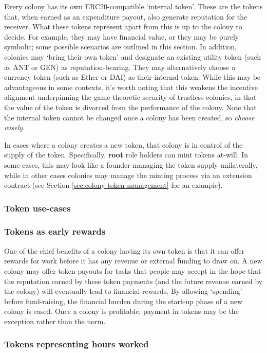 Every colony has its own ERC20-compatible `internal token'. These are the tokens that, when earned as an expenditure payout, also generate reputation for the receiver. What these tokens represent apart from this is up to the colony to decide. For example, they may have financial value, or they may be purely symbolic; some possible scenarios are outlined in this section. In addition, colonies may `bring their own token' and designate an existing utility token (such as ANT or GEN) as reputation-bearing. They may alternatively choose a currency token (such as Ether or DAI) as their internal token. While this may be advantageous in some contexts, it’s worth noting that this weakens the incentive alignment underpinning the game theoretic security of trustless colonies, in that the value of the token is divorced from the performance of the colony. Note that the internal token cannot be changed once a colony has been created, so \textit{choose wisely}.

In cases where a colony creates a new token, that colony is in control of the supply of the token. Specifically, \textbf{root} role holders can mint tokens at-will. In some cases, this may look like a founder managing the token supply unilaterally, while in other cases colonies may manage the minting process via an extension contract (see Section \ref{sec:colony-token-management} for an example).

\subsubsection{Token use-cases}

\subsubsection*{Tokens as early rewards}

One of the chief benefits of a colony having its own token is that it can offer rewards for work before it has any revenue or external funding to draw on.
A new colony may offer token payouts for tasks that people may accept in the hope that the reputation earned by these token payments (and the future revenue earned by the colony) will eventually lead to financial rewards. By allowing `spending' before fund-raising, the financial burden during the start-up phase of a new colony is eased. Once a colony is profitable, payment in tokens may be the exception rather than the norm.

\subsubsection*{Tokens representing hours worked}

